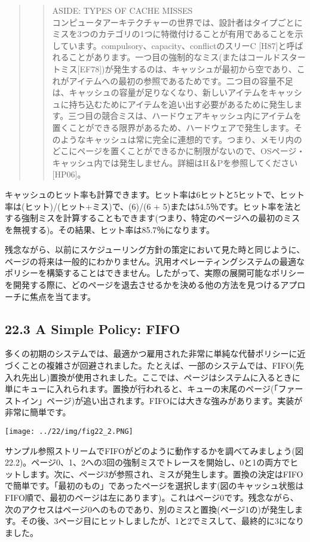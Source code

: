 \begin{quote}
\begin{quote}
ASIDE: TYPES OF CACHE MISSES\\
コンピュータアーキテクチャーの世界では、設計者はタイプごとにミスを3つのカテゴリの1つに特徴付けることが有用であることを示しています。compulsory、capacity、conflictのスリーC
{[}H87{]}と呼ばれることがあります。一つ目の強制的なミス(またはコールドスタートミス{[}EF78{]})が発生するのは、キャッシュが最初から空であり、これがアイテムへの最初の参照であるためです。二つ目の容量不足は、キャッシュの容量が足りなくなり、新しいアイテムをキャッシュに持ち込むためにアイテムを追い出す必要があるために発生します。三つ目の競合ミスは、ハードウェアキャッシュ内にアイテムを置くことができる限界があるため、ハードウェアで発生します。そのようなキャッシュは常に完全に連想的です。つまり、メモリ内のどこにページを置くことができるかに制限がないので、OSページ・キャッシュ内では発生しません。詳細はH＆Pを参照してください{[}HP06{]}。
\end{quote}
\end{quote}

キャッシュのヒット率も計算できます。ヒット率は6ヒットと5ヒットで、ヒット率は(ヒット)/(ヒット+ミス)で、(6)/(6
+
5)または54.5％です。ヒット率を法とする強制ミスを計算することもできます(つまり、特定のページへの最初のミスを無視する)。その結果、ヒット率は85.7％になります。

残念ながら、以前にスケジューリング方針の策定において見た時と同じように、ページの将来は一般的にわかりません。汎用オペレーティングシステムの最適なポリシーを構築することはできません。したがって、実際の展開可能なポリシーを開発する際に、どのページを退去させるかを決める他の方法を見つけるアプローチに焦点を当てます。

\hypertarget{a-simple-policy-fifo}{%
\subsection*{22.3 A Simple Policy: FIFO}\label{a-simple-policy-fifo}}

多くの初期のシステムでは、最適かつ雇用された非常に単純な代替ポリシーに近づくことの複雑さが回避されました。たとえば、一部のシステムでは、FIFO(先入れ先出し)置換が使用されました。ここでは、ページはシステムに入るときに単にキューに入れられます。置換が行われると、キューの末尾のページ(「ファーストイン」ページ)が追い出されます。FIFOには大きな強みがあります。実装が非常に簡単です。

\texttt{[image: ../22/img/fig22\_2.PNG]}

サンプル参照ストリームでFIFOがどのように動作するかを調べてみましょう(図22.2)。ページ0、1、2への3回の強制ミスでトレースを開始し、0と1の両方でヒットします。次に、ページ3が参照され、ミスが発生します。置換の決定はFIFOで簡単です。「最初のもの」であったページを選択します(図のキャッシュ状態はFIFO順で、最初のページは左にあります)。これはページ0です。残念ながら、次のアクセスはページ0へのものであり、別のミスと置換(ページ1の)が発生します。その後、3ページ目にヒットしましたが、1と2でミスして、最終的に3になりました。


